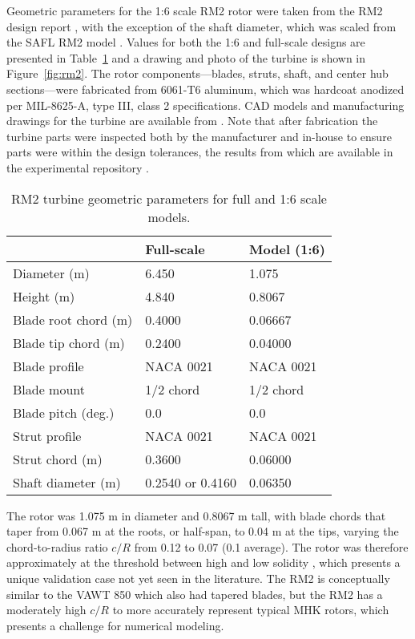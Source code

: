 Geometric parameters for the 1:6 scale RM2 rotor were taken from the RM2 design
report \cite{Barone2011}, with the exception of the shaft diameter, which was
scaled from the SAFL RM2 model \cite{Hill2014}. Values for both the 1:6 and
full-scale designs are presented in Table~\ref{tab:rm2-geom} and a drawing and
photo of the turbine is shown in Figure~\ref{fig:rm2}. The rotor
components---blades, struts, shaft, and center hub sections---were fabricated
from 6061-T6 aluminum, which was hardcoat anodized per MIL-8625-A, type III,
class 2 specifications. CAD models and manufacturing drawings for the turbine
are available from \cite{Bachant2015-RM2-CAD}. Note that after fabrication the
turbine parts were inspected both by the manufacturer and in-house to ensure
parts were within the design tolerances, the results from which are available in
the experimental repository \cite{Bachant2016-RM2-data}.

\begin{table}
    \centering
    \begin{tabular}{l|l|l}
        & Full-scale & Model (1:6) \\
        \hline
        Diameter (m)   & 6.450 & 1.075 \\
        Height (m)     & 4.840 & 0.8067 \\
        Blade root chord (m) & 0.4000 & 0.06667 \\
        Blade tip chord (m)  & 0.2400 & 0.04000 \\
        Blade profile & NACA 0021 & NACA 0021 \\
        Blade mount & 1/2 chord & 1/2 chord \\
        Blade pitch (deg.) & 0.0 & 0.0 \\
        Strut profile & NACA 0021 & NACA 0021 \\
        Strut chord (m) & 0.3600 & 0.06000 \\
        Shaft diameter (m) & 0.2540 \cite{Beam2011} or 0.4160 \cite{Hill2014} & 0.06350\\
    \end{tabular}
    \caption{RM2 turbine geometric parameters for full and 1:6 scale models.}
    \label{tab:rm2-geom}
\end{table}

The rotor was 1.075 m in diameter and 0.8067 m tall, with blade chords that
taper from 0.067 m at the roots, or half-span, to 0.04 m at the tips, varying
the chord-to-radius ratio $c/R$ from 0.12 to 0.07 (0.1 average). The rotor was
therefore approximately at the threshold between high and low solidity
\cite{Strickland1981,Fiedler2009}, which presents a unique validation case not
yet seen in the literature. The RM2 is conceptually similar to the VAWT 850
\cite{Mays1990} which also had tapered blades, but the RM2 has a moderately high
$c/R$ to more accurately represent typical MHK rotors, which presents a
challenge for numerical modeling.

